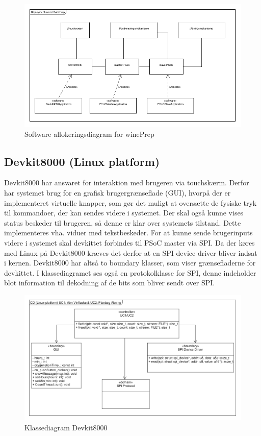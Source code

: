 \begin{figure}[H]
\includegraphics[scale=0.8]{Software/Allokeringsdiagram}
\caption{Software allokeringsdiagram for winePrep}
\end{figure}  

\subsection{Devkit8000 (Linux platform)}

Devkit8000 har ansvaret for interaktion med brugeren via touchskærm. Derfor har systemet brug for en grafisk brugergrænseflade (GUI), hvorpå der er
implementeret virtuelle knapper, som gør det muligt at oversætte de fysiske tryk til kommandoer, der kan sendes videre i systemet. Der skal også kunne vises
status beskeder til brugeren, så denne er klar over systemets tilstand. Dette implementeres vha. viduer med tekstbeskeder. For at kunne sende brugerinputs 
videre i systemet skal devkittet forbindes til PSoC master via SPI. Da der køres med Linux på Devkit8000 kræves det derfor at en SPI device driver bliver
indsat i kernen. Devkit8000 har altså to boundary klasser, som viser grænsefladerne for devkittet. I klassediagramet ses også en protokolklasse for SPI, denne 
indeholder blot information til dekodning af de bits som bliver sendt over SPI.   

\begin{figure}[H]
\includegraphics[scale=0.8]{Software/Klassediagram_Linuxplatform}
\caption{Klassediagram Devkit8000}
\end{figure}


